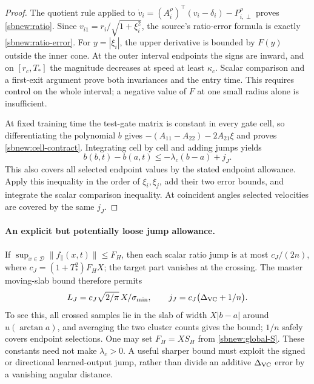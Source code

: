 \documentclass{article} %
\theoremstyle{plain}
\theoremstyle{definition}
\theoremstyle{remark}
\begin{document}
\begin{proof}
The quotient rule applied to
$\dot v_i=(A_i^\rho)^\top(v_i-\delta_i)-P_{i,\perp}^\rho$
proves \eqref{sbnew:ratio}. Since $v_{i1}=r_i/\sqrt{1+\xi_i^2}$,
the source's ratio-error formula is exactly \eqref{sbnew:ratio-error}.
For $y=|\xi_i|$, the upper derivative is bounded by $F(y)$ outside the
inner cone. At the outer interval endpoints the signs are inward, and on
$[r_c,T_*]$ the magnitude decreases at speed at least $\kappa_c$.
Scalar comparison and a first-exit argument prove both invariances and
the entry time. This requires control on the whole interval; a negative
value of $F$ at one small radius alone is insufficient.

At fixed training time the test-gate matrix is constant in every gate cell,
so differentiating the polynomial $b$ gives
$-(A_{11}-A_{22})-2A_{21}\xi$ and proves
\eqref{sbnew:cell-contract}. Integrating cell by cell and adding jumps yields
\[
 b(b,t)-b(a,t)\le-\lambda_c(b-a)+j_J.
\]
This also covers all selected endpoint values by the stated endpoint
allowance. Apply this inequality in the order of $\xi_i,\xi_j$, add their
two error bounds, and integrate the scalar comparison inequality. At
coincident angles selected velocities are covered by the same $j_J$.
\end{proof}

\paragraph{An explicit but potentially loose jump allowance.}
If $\sup_{x\in\mathcal D}\|f_\parallel(x,t)\|\le F_H$, then each scalar
ratio jump is at most
$c_J/(2n)$, where $c_J=(1+T_*^2)F_H X$; the target part vanishes at the
crossing. The master moving-slab bound therefore permits
\begin{equation}\label{sbnew:jump-explicit}
 L_J=c_J\sqrt{2/\pi}\,X/\sigma_{\min},\qquad
 j_J=c_J\bigl(\Delta_{\rm VC}+1/n\bigr).
\end{equation}
To see this, all crossed samples lie in the slab of width
$X|b-a|$ around $u(\arctan a)$, and averaging the two cluster counts
gives the bound; $1/n$ safely covers endpoint selections.
One may set $F_H=XS_H$ from \eqref{sbnew:global-S}. These constants need
not make $\lambda_c>0$. A useful sharper bound must exploit the signed
or directional learned-output jump, rather than divide an additive
$\Delta_{\rm VC}$ error by a vanishing angular distance.
\end{document}
